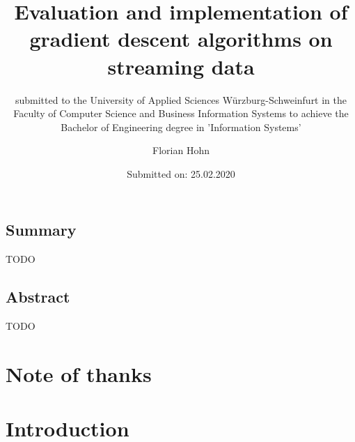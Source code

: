 \documentclass[12pt,oneside,a4paper,parskip]{scrbook}
\def\BaAuthor{Florian Hohn}
\def\BaTitle{Evaluation and implementation of gradient descent algorithms on streaming data}
\def\BaSupervisorOne{Prof.\ Dr.\ Frank-Michael Schleif}
\def\BaSupervisorTwo{Moritz Heusinger}
\def\BaDeadline{25.02.2020}
\begin{document}


\frontmatter
\titlehead{%
  {University of Applied Sciences W\"{u}rzburg-Schweinfurt
  Faculty of Computer Science and Business Information Systems}}
\subject{Bachelor-Thesis}
\title{\BaTitle\\[15mm]}
\subtitle{\normalsize{submitted to the University of Applied Sciences W\"{u}rzburg-Schweinfurt in the Faculty of Computer Science and Business Information Systems to achieve the Bachelor of Engineering degree in 'Information Systems'}}
\author{\BaAuthor}
\date{\normalsize{Submitted on: \BaDeadline}}
\publishers{
  \normalsize{First Reader: \BaSupervisorOne}\\
  \normalsize{Second Reader: \BaSupervisorTwo}\\
}


\maketitle



\section*{Summary}

TODO

\section*{Abstract}

TODO

\newpage
\chapter*{Note of thanks}



\tableofcontents	




\mainmatter

\chapter{Introduction}\label{ch:intro}
\end{document}
